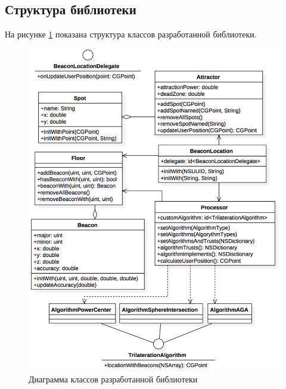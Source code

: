 \subsection{Структура библиотеки}

На рисунке \ref{fig:uml} показана структура классов разработанной библиотеки.

\begin{figure}[ht]
    \centering %
    \includegraphics[scale=0.7]{img/uml2}
    \caption{Диаграмма классов разработанной библиотеки}
    \label{fig:uml}
\end{figure}